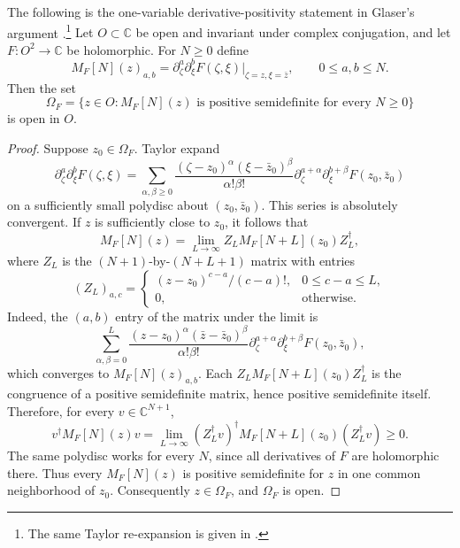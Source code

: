 \documentclass[11pt, letterpaper, reqno]{amsart}
\theoremstyle{definition}
\newenvironment{theorem}
{\pushQED{\qed}\renewcommand{\qedsymbol}{$\blacksquare\square$}\theoremxx}
{\popQED\endtheoremxx}
\theoremstyle{remark}
\newcommand{\bbC}{\mathbb{C}}
\begin{document}
The following is the one-variable derivative-positivity statement
in Glaser's argument \cite[\S3, p.~14]{Glaser1969}.\footnote{The same
Taylor re-expansion is given in \cite[Appendix~C, (145)--(146)]{BEM1998}.}
\begin{theorem}\label{thm:analytic-open}
Let $O\subset\bbC$ be open and invariant under complex conjugation,
and let $F:O^2\to\bbC$ be holomorphic. For $N\geq0$ define
\begin{equation}
 M_F[N](z)_{a,b}
 =\partial_\zeta^a\partial_\xi^bF(\zeta,\xi)
      \Big|_{\zeta=z,\xi=\bar z},\qquad0\leq a,b\leq N.
\end{equation}
Then the set
\begin{equation}
 \Omega_F=\{z\in O:M_F[N](z)\text{ is positive semidefinite
 for every }N\geq0\}
\end{equation}
is open in $O$.
\end{theorem}
\begin{proof}
Suppose $z_0\in\Omega_F$. Taylor expand
\begin{equation}
 \partial_\zeta^a\partial_\xi^bF(\zeta,\xi)
 =\sum_{\alpha,\beta\geq0}
 \frac{(\zeta-z_0)^\alpha(\xi-\bar z_0)^\beta}{\alpha!\beta!}
 \partial_\zeta^{a+\alpha}\partial_\xi^{b+\beta}F(z_0,\bar z_0)
\end{equation}
on a sufficiently small polydisc about $(z_0,\bar z_0)$.
This series is absolutely convergent. If $z$ is sufficiently close
to $z_0$, it follows that
\begin{equation}\label{eq:Taylor-matrices}
 M_F[N](z)=\lim_{L\to\infty}Z_LM_F[N+L](z_0)Z_L^\dagger,
\end{equation}
where $Z_L$ is the $(N+1)$-by-$(N+L+1)$ matrix with entries
\begin{equation}
 (Z_L)_{a,c}=\begin{cases}
 (z-z_0)^{c-a}/(c-a)!,&0\leq c-a\leq L,\\
 0,&\text{otherwise}.
 \end{cases}
\end{equation}
Indeed, the $(a,b)$ entry of the matrix under the limit is
\begin{equation}
 \sum_{\alpha,\beta=0}^L
 \frac{(z-z_0)^\alpha(\bar z-\bar z_0)^\beta}{\alpha!\beta!}
 \partial_\zeta^{a+\alpha}\partial_\xi^{b+\beta}F(z_0,\bar z_0),
\end{equation}
which converges to $M_F[N](z)_{a,b}$.
Each $Z_LM_F[N+L](z_0)Z_L^\dagger$ is the congruence of a positive
semidefinite matrix, hence positive semidefinite itself. Therefore,
for every $v\in\bbC^{N+1}$,
\begin{equation}
 v^\dagger M_F[N](z)v
 =\lim_{L\to\infty}(Z_L^\dagger v)^\dagger
       M_F[N+L](z_0)(Z_L^\dagger v)\geq0.
\end{equation}
The same polydisc works for every $N$, since all derivatives of $F$
are holomorphic there. Thus every $M_F[N](z)$ is positive
semidefinite for $z$ in one common neighborhood of $z_0$.
Consequently $z\in\Omega_F$, and $\Omega_F$ is open.
\end{proof}
\end{document}
